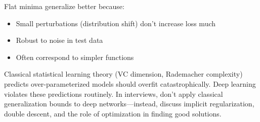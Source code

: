 Flat minima generalize better because:
\begin{itemize}
    \item Small perturbations (distribution shift) don't increase loss much
    \item Robust to noise in test data
    \item Often correspond to simpler functions
\end{itemize}

\begin{warningbox}
Classical statistical learning theory (VC dimension, Rademacher complexity) predicts over-parameterized models should overfit catastrophically. Deep learning violates these predictions routinely. In interviews, don't apply classical generalization bounds to deep networks---instead, discuss implicit regularization, double descent, and the role of optimization in finding good solutions.
\end{warningbox}

